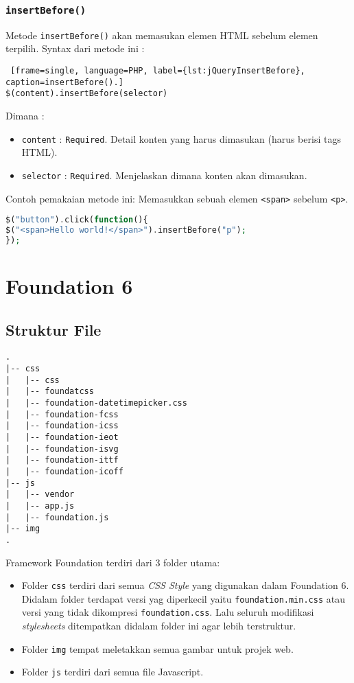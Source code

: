 \subsubsection{\texttt{insertBefore()}}
Metode \texttt{insertBefore()} akan memasukan elemen HTML sebelum elemen terpilih.
Syntax dari metode ini :
\begin{lstlisting} [frame=single, language=PHP, label={lst:jQueryInsertBefore}, caption=insertBefore().]
$(content).insertBefore(selector)
\end{lstlisting}
Dimana :
\begin{itemize}
	\item \texttt{content} : \texttt{Required}. Detail konten yang harus dimasukan (harus berisi tags HTML).
	\item \texttt{selector} : \texttt{Required}. Menjelaskan dimana konten akan dimasukan. 
\end{itemize}

Contoh pemakaian metode ini: Memasukkan sebuah elemen \texttt{<span>} sebelum \texttt{<p>}.
\begin{lstlisting}[frame=single, language=PHP, label={lst:jQueryinsertBefore}, caption=jQuery insertBefore().]
$("button").click(function(){
$("<span>Hello world!</span>").insertBefore("p");
});
\end{lstlisting}

\section{Foundation 6}
\subsection{Struktur File}
\begin{lstlisting}[basicstyle=\ttfamily, frame=single,
columns=fullflexible, keepspaces=true, breaklines=true, label={lst:fileFoundation}, caption=Struktur File Foundation.]
.
|-- css
|   |-- css 
|   |-- foundatcss 
|   |-- foundation-datetimepicker.css 
|   |-- foundation-fcss 
|   |-- foundation-icss 
|   |-- foundation-ieot 
|   |-- foundation-isvg 
|   |-- foundation-ittf 
|   |-- foundation-icoff 
|-- js
|   |-- vendor 
|   |-- app.js 
|   |-- foundation.js 
|-- img
.
\end{lstlisting}

Framework Foundation terdiri dari 3 folder utama:
\begin{itemize}
	\item Folder \texttt{css} terdiri dari semua \textit{CSS Style} yang digunakan dalam Foundation 6. Didalam folder terdapat versi yag diperkecil yaitu \verb|foundation.min.css| atau versi yang tidak dikompresi \verb|foundation.css|. Lalu seluruh modifikasi \textit{stylesheets} ditempatkan didalam folder ini agar lebih terstruktur.
	\item Folder \texttt{img} tempat meletakkan semua gambar untuk projek web.
	\item Folder \texttt{js} terdiri dari semua file Javascript.
\end{itemize} 
\cite{zurbfoundation:17}

